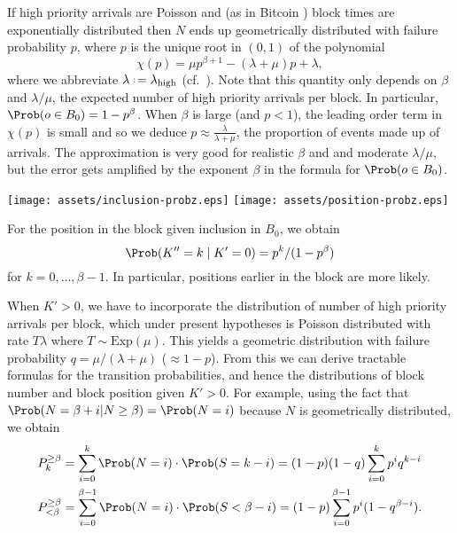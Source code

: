 \documentclass[a4paper,11pt]{article}
\begin{document}
\begin{example}
\label{exponential-block-time}

  If high priority arrivals are Poisson and (as in Bitcoin \cite{kasahara2019effect}) block times are exponentially distributed then $N$ ends up geometrically distributed with failure probability $p$, where $p$ is the unique root in $(0,1)$ of the polynomial
  \[
    \chi(p) = \mu p^{\beta+1} - (\lambda + \mu)p + \lambda,
  \]
  where we abbreviate $\lambda\defeq\lambda_\mathrm{high}$ (cf.~\cite[\S3.2]{gross2018fundamentals}).
  Note that this quantity only depends on $\beta$ and $\lambda/\mu$, the expected number of high priority arrivals per block.
  In particular, $\Prob(o\in B_0) = 1-p^{\beta}$.
  When $\beta$ is large (and $p<1$), the leading order term in $\chi(p)$ is small and so we deduce $p\approx \frac{\lambda}{\lambda+\mu}$, the proportion of events made up of arrivals.
  The approximation is very good for realistic $\beta$ and and moderate $\lambda/\mu$, but the error gets amplified by the exponent $\beta$ in the formula for $\Prob(o\in B_0)$.
  \begin{center}
    \texttt{[image: assets/inclusion-probz.eps]}
    \texttt{[image: assets/position-probz.eps]}
  \end{center}    
  For the position in the block given inclusion in $B_0$, we obtain
  \[
    \Prob(K''=k \mid K'=0 ) = p^k / (1-p^\beta)
  \]
  for $k=0,\ldots,\beta-1$. In particular, positions earlier in the block are more likely.
  
  When $K'>0$, we have to incorporate the distribution of number of high priority arrivals per block, which under present hypotheses is Poisson distributed with rate $T\lambda$ where $T\sim\mathrm{Exp}(\mu)$.
  This yields a geometric distribution with failure probability $q=\mu/(\lambda+\mu)$ ($\approx 1-p$).
  From this we can derive tractable formulas for the transition probabilities, and hence the distributions of block number and block position given $K'>0$. 
  For example, using the fact that $\Prob(N=\beta+i|N\geq\beta)= \Prob(N=i)$ because $N$ is geometrically distributed, we obtain
  \begin{align}
    P^{\geq\beta}_k &= \sum_{i=0}^{k}\Prob(N=i)\cdot \Prob(S=k-i) = (1-p)(1-q)\sum_{i=0}^{k}p^iq^{k-i} \\
    P^{\geq\beta}_{<\beta} &= \sum_{i=0}^{\beta-1}\Prob(N=i)\cdot \Prob(S<\beta-i) = (1-p)\sum_{i=0}^{\beta-1}p^i(1-q^{\beta-i}).
  \end{align}
  
  \begin{comment}
  Combining these calculations with the formula \eqref{K-dist}, we find
  \[
    \Prob(K=n\beta + k) = p^{n\beta}\cdot p^k\cdot(1-p).
  \]
  That is, the prefix length is geometrically distributed with failure probabilty $p$.
  In particular we have $\mathbb{E}(K) = p/(1-p)$ (the odds of the queue being nonempty) and standard deviation $\sigma(K) = \sqrt{p}/(1-p)$.
  \end{comment}
  
\end{example}
\end{document}
